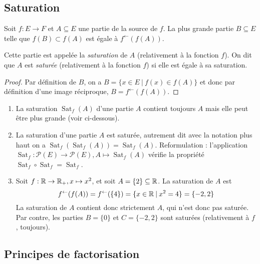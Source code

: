 \subsection{Saturation}


\begin{propdef}
Soit $f : E\to F$ et $A \subseteq E$ une partie de la source de $f$. La plus grande partie $B\subseteq E$ telle que $f(B) \subset f(A)$ est égale à $f^\leftarrow(f(A))$.

Cette partie est appelée la \emph{saturation} de $A$ (relativement à la fonction $f$). On dit que $A$ est \emph{saturée} (relativement à la fonction $f$) si elle est égale à sa saturation.
\end{propdef}
\begin{proof}
Par définition de $B$, on a $B = \{x\in E\:|\: f(x)\in f(A) \}$ et donc par définition d'une image réciproque, $B = f^\leftarrow(f(A))$.
\end{proof}

\begin{exemple}
\begin{enumerate}
\item La saturation $\operatorname{Sat}_f(A)$ d'une partie $A$ contient toujours $A$ mais elle peut être plus grande (voir ci-dessous).
\item La saturation d'une partie $A$ est saturée, autrement dit avec la notation plus haut  on a  $\operatorname{Sat}_f(\operatorname{Sat}_f(A)) = \operatorname{Sat}_f(A)$. Reformulation : l'application $\operatorname{Sat}_f : \mathcal P(E) \to \mathcal P(E), A\mapsto \operatorname{Sat}_f(A)$ vérifie la propriété $\operatorname{Sat}_f \circ \operatorname{Sat}_f = \operatorname{Sat}_f$.
\item Soit $f : \mathbb{R}\to \mathbb{R}_+, x\mapsto x^2$, et soit $A=\{2\} \subseteq \mathbb{R}$. La saturation de $A$ est 
\[f^\leftarrow(f(A)) = f^\leftarrow(\{4\}) = \{x\in \mathbb{R}\:|\: x^2=4\} = \{-2,2\}
\]
La saturation de $A$ contient donc strictement $A$, qui n'est donc pas saturée. Par contre, les parties $B = \{0\}$ et $C=\{-2,2\}$ sont saturées (relativement à $f$, toujours).
\end{enumerate}
\end{exemple}


\subsection{Principes de factorisation}

